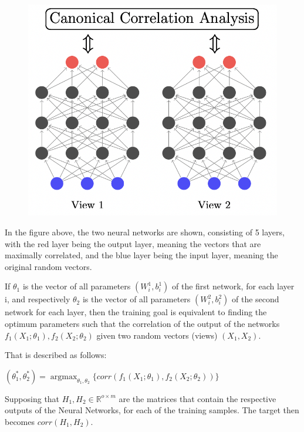 {\newpage
\begin{figure}
    \centering
    \includegraphics[scale=0.8]{figures/Theoretical_Background/DCCA.png}
    \caption{}
\end{figure}
\bigbreak

In the figure above, the two neural networks are shown, consisting of 5 layers, with the red layer being the output layer, meaning the vectors that are maximally correlated, and the blue layer being the input layer, meaning the original random vectors. 

If $θ_1$ is the vector of all parameters $(W_i^1, b_i^1)$ of the first network, for each layer i, and respectively $θ_2$ is the vector of all parameters $(W_i^2, b_i^2)$ of the second network for each layer, then the training goal is equivalent to finding the optimum parameters such that the correlation of the output of the networks $f_1(X_1; θ_1), f_2(X_2;θ_2)$ given two random vectors (views) $(X_1, X_2)$. 

That is described as follows:

\bigbreak
$(θ_1^\ast, θ_2^\ast)  = \operatorname{argmax}_{θ_1, θ_2} \{ corr(f_1(X_1; θ_1), f_2(X_2; θ_2))\}$
\bigbreak

Supposing that $H_1,H_2 \in \mathbb{R}^{o\times m}$ are the matrices that contain the respective outputs of the Neural Networks, for each of the  training samples. The target then becomes $corr(H_1, H_2)$. 

}
